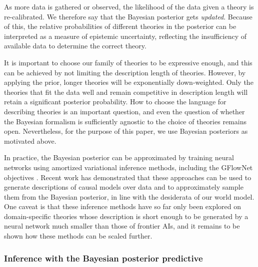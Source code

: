 As more data is gathered or observed, the likelihood of the data given a theory is re-calibrated. We therefore say that the Bayesian posterior gets \emph{updated}. Because of this, the relative probabilities of different theories in the posterior can be interpreted as a measure of epistemic uncertainty, reflecting the insufficiency of available data to determine the correct theory.

It is important to choose our family of theories to be expressive enough, and this can be achieved by not limiting the description length of theories. However, by applying the prior, longer theories will be exponentially down-weighted. Only the theories that fit the data well and remain competitive in description length will retain a significant posterior probability.
How to choose the language for describing theories is an important question, and even the question of whether the Bayesian formalism is sufficiently agnostic to the choice of theories \cite{www.google.co.uk.books.edition.Introduction.to.Imprecise.Probabilities.9qXIEAAAQBAJ.hl.en, www.google.co.uk.books.edition.The.Geometry.of.Uncertainty.jNQPEAAAQBAJ, ecommons.cornell.edu.server.api.core.bitstreams.ef0ef95b.6156.487e.900e.6c33714ed0c3.content} remains open. Nevertheless, for the purpose of this paper, we use Bayesian posteriors as motivated above.

In practice, the Bayesian posterior can be approximated by training neural networks using amortized variational inference methods, including the GFlowNet objectives \cite{proceedings.neurips.cc.paper.2021.hash.e614f646836aaed9f89ce58e837e2310.Abstract.html}. Recent work has demonstrated that these approaches can be used to generate descriptions of causal models over data \cite{proceedings.mlr.press.v180.deleu22a.html, proceedings.neurips.cc.paper.files.paper.2023.hash.639a9a172c044fbb64175b5fad42e9a5.Abstract.Conference.html} and to approximately sample them from the Bayesian posterior, in line with the desiderata of our world model. One caveat is that these inference methods have so far only been explored on domain-specific theories whose description is short enough to be generated by a neural network much smaller than those of frontier AIs, and it remains to be shown how these methods can be scaled further.

\subsubsection{Inference with the Bayesian posterior predictive}
\label{sec:plan:bayesian:inference}
    
